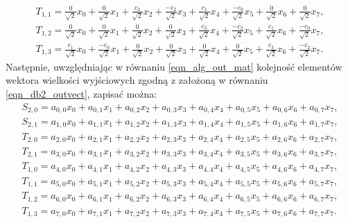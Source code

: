 \begin{gather}
T_{1,1} = \frac{0}{\sqrt{2}} x_{0} + \frac{0}{\sqrt{2}} x_{1} + \frac{c_{3}}{\sqrt{2}} x_{2} + \frac{- c_{2}}{\sqrt{2}} x_{3} + \frac{c_{1}}{\sqrt{2}} x_{4} + \frac{- c_{0}}{\sqrt{2}} x_{5} + \frac{0}{\sqrt{2}} x_{6} + \frac{0}{\sqrt{2}} x_{7} \label{eqn_db2_outvect_t_1_1_full}, \\
T_{1,2} = \frac{0}{\sqrt{2}} x_{0} + \frac{0}{\sqrt{2}} x_{1} + \frac{0}{\sqrt{2}} x_{2} + \frac{0}{\sqrt{2}} x_{3} + \frac{c_{3}}{\sqrt{2}} x_{4} + \frac{- c_{2}}{\sqrt{2}} x_{5} + \frac{c_{1}}{\sqrt{2}} x_{6} + \frac{- c_{0}}{\sqrt{2}} x_{7} \label{eqn_db2_outvect_t_1_2_full}, \\
T_{1,3} = \frac{c_{1}}{\sqrt{2}} x_{0} + \frac{- c_{0}}{\sqrt{2}} x_{1} + \frac{0}{\sqrt{2}} x_{2} + \frac{0}{\sqrt{2}} x_{3} + \frac{0}{\sqrt{2}} x_{4} + \frac{0}{\sqrt{2}} x_{5} + \frac{c_{3}}{\sqrt{2}} x_{6} + \frac{- c_{2}}{\sqrt{2}} x_{7} \label{eqn_db2_outvect_t_1_3_full}.
\end{gather}
Następnie, uwzględniając w równaniu \eqref{eqn_alg_out_mat} kolejność elementów wektora wielkości wyjściowych zgodną z założoną w równaniu \eqref{eqn_db2_outvect}, zapisać można:
\begin{gather}
S_{2,0} = a_{0,0} x_{0} + a_{0,1} x_{1} + a_{0,2} x_{2} + a_{0,3} x_{3} + a_{0,4} x_{4} + a_{0,5} x_{5} + a_{0,6} x_{6} + a_{0,7} x_{7} \label{eqn_db2_outvect_s_2_0_row}, \\
S_{2,1} = a_{1,0} x_{0} + a_{1,1} x_{1} + a_{1,2} x_{2} + a_{1,3} x_{3} + a_{1,4} x_{4} + a_{1,5} x_{5} + a_{1,6} x_{6} + a_{1,7} x_{7} \label{eqn_db2_outvect_s_2_1_row}, \\
T_{2,0} = a_{2,0} x_{0} + a_{2,1} x_{1} + a_{2,2} x_{2} + a_{2,3} x_{3} + a_{2,4} x_{4} + a_{2,5} x_{5} + a_{2,6} x_{6} + a_{2,7} x_{7} \label{eqn_db2_outvect_t_2_0_row}, \\
T_{2,1} = a_{3,0} x_{0} + a_{3,1} x_{1} + a_{3,2} x_{2} + a_{3,3} x_{3} + a_{3,4} x_{4} + a_{3,5} x_{5} + a_{3,6} x_{6} + a_{3,7} x_{7} \label{eqn_db2_outvect_t_2_1_row}, \\
T_{1,0} = a_{4,0} x_{0} + a_{4,1} x_{1} + a_{4,2} x_{2} + a_{4,3} x_{3} + a_{4,4} x_{4} + a_{4,5} x_{5} + a_{4,6} x_{6} + a_{4,7} x_{7} \label{eqn_db2_outvect_t_1_0_row}, \\
T_{1,1} = a_{5,0} x_{0} + a_{5,1} x_{1} + a_{5,2} x_{2} + a_{5,3} x_{3} + a_{5,4} x_{4} + a_{5,5} x_{5} + a_{5,6} x_{6} + a_{5,7} x_{7} \label{eqn_db2_outvect_t_1_1_row}, \\
T_{1,2} = a_{6,0} x_{0} + a_{6,1} x_{1} + a_{6,2} x_{2} + a_{6,3} x_{3} + a_{6,4} x_{4} + a_{6,5} x_{5} + a_{6,6} x_{6} + a_{6,7} x_{7} \label{eqn_db2_outvect_t_1_2_row}, \\
T_{1,3} = a_{7,0} x_{0} + a_{7,1} x_{1} + a_{7,2} x_{2} + a_{7,3} x_{3} + a_{7,4} x_{4} + a_{7,5} x_{5} + a_{7,6} x_{6} + a_{7,7} x_{7} \label{eqn_db2_outvect_t_1_3_row}.
\end{gather}

